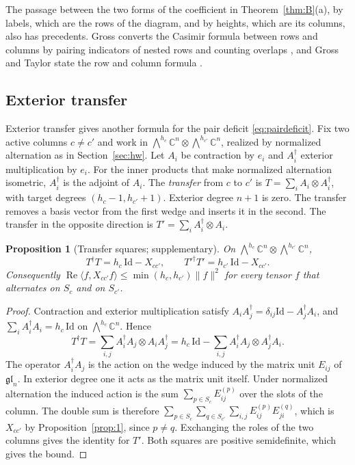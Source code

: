 \documentclass[11pt]{amsart}
\newcommand{\notlean}{supplementary}
\newtheorem{proposition}{Proposition}
\theoremstyle{definition}
\theoremstyle{remark}
\begin{document}
The passage between the two forms of the coefficient
in Theorem~\ref{thm:B}(a), by labels, which are the rows of the diagram, and
by heights, which are its columns, also has precedents. Gross converts the
Casimir formula between rows and columns by pairing indicators of nested
rows and counting overlaps \cite[Appendix~A.1]{Gross}, and Gross and Taylor
state the row and column formula \cite[(2.1)--(2.2)]{GrossTaylor}.

\subsection{Exterior transfer}\label{sec:transfer}

Exterior transfer gives another formula for the pair deficit
\eqref{eq:pairdeficit}. Fix two active columns \(c\ne c'\) and work in
\(\bigwedge^{h_c}\mathbb C^n\otimes\bigwedge^{h_{c'}}\mathbb C^n\), realized
by normalized alternation as in Section~\ref{sec:hw}. Let \(A_i\) be
contraction by \(e_i\) and \(A_i^\dagger\) exterior multiplication by
\(e_i\). For the inner products that make normalized alternation isometric,
\(A_i^\dagger\) is the adjoint of \(A_i\). The \emph{transfer} from \(c\) to
\(c'\) is \(T=\sum_iA_i\otimes A_i^\dagger\), with target degrees
\((h_c-1,h_{c'}+1)\). Exterior degree \(n+1\) is zero. The transfer removes a basis vector from
the first wedge and inserts it in the second. The transfer in the opposite
direction is \(T'=\sum_iA_i^\dagger\otimes A_i\).

\begin{proposition}[Transfer squares; \notlean]\label{prop:11}
On \(\bigwedge^{h_c}\mathbb C^n\otimes\bigwedge^{h_{c'}}\mathbb C^n\),
\[
T^\dagger T=h_c\,\mathrm{Id}-X_{cc'},\qquad
T'^\dagger T'=h_{c'}\,\mathrm{Id}-X_{cc'} .
\]
Consequently
\(\operatorname{Re}\langle f,X_{cc'}f\rangle\le\min(h_c,h_{c'})\|f\|^2\) for
every tensor \(f\) that alternates on \(S_c\) and on \(S_{c'}\).
\end{proposition}

\begin{proof}
Contraction and exterior multiplication satisfy
\(A_iA_j^\dagger=\delta_{ij}\mathrm{Id}-A_j^\dagger A_i\), and
\(\sum_iA_i^\dagger A_i=h_c\,\mathrm{Id}\) on \(\bigwedge^{h_c}\mathbb C^n\).
Hence
\[
T^\dagger T=\sum_{i,j}A_i^\dagger A_j\otimes A_iA_j^\dagger
=h_c\,\mathrm{Id}-\sum_{i,j}A_i^\dagger A_j\otimes A_j^\dagger A_i .
\]
The operator \(A_i^\dagger A_j\) is the action on the wedge induced by the
matrix unit \(E_{ij}\) of \(\mathfrak{gl}_n\). In exterior degree one it acts
as the matrix unit itself. Under normalized alternation the induced action
is the sum
\(\sum_{p\in S_c}E^{(p)}_{ij}\) over the slots of the column. The double sum
is therefore
\(\sum_{p\in S_c}\sum_{q\in S_{c'}}\sum_{i,j}E^{(p)}_{ij}E^{(q)}_{ji}\), which
is \(X_{cc'}\) by Proposition~\ref{prop:1}, since \(p\ne q\). Exchanging the
roles of the two columns gives the identity for \(T'\). Both squares are
positive semidefinite, which gives the bound.
\end{proof}
\end{document}
